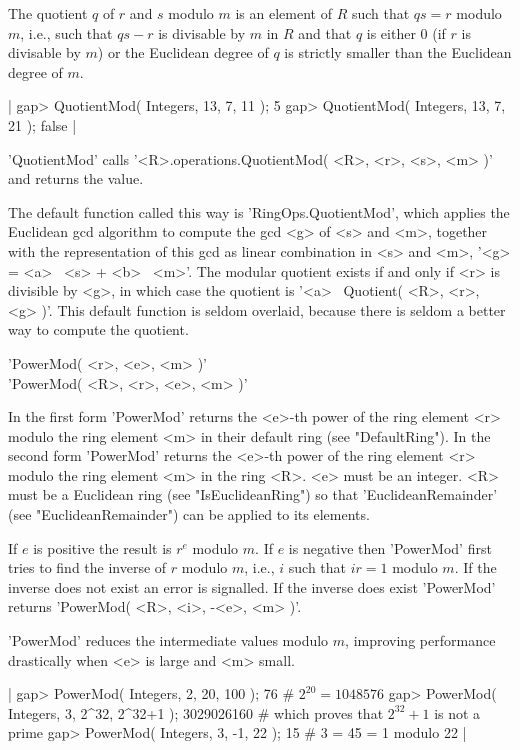 The quotient $q$ of $r$ and $s$ modulo $m$ is an element of $R$ such that
$q s = r$ modulo $m$, i.e., such that $q s - r$  is divisable  by $m$  in
$R$ and  that  $q$  is  either  0 (if  $r$ is divisable  by $m$)  or  the
Euclidean  degree of $q$ is strictly smaller than the Euclidean degree of
$m$.

|    gap> QuotientMod( Integers, 13, 7, 11 );
    5
    gap> QuotientMod( Integers, 13, 7, 21 );
    false |

'QuotientMod'  calls '<R>.operations.QuotientMod( <R>,  <r>,  <s>, <m> )'
and returns the value.

The  default function  called  this  way  is 'RingOps.QuotientMod', which
applies the  Euclidean gcd algorithm to  compute the gcd  <g>  of <s> and
<m>, together with  the  representation of this gcd as linear combination
in <s> and <m>, '<g> = <a>  \*\ <s> + <b> \*\ <m>'.  The modular quotient
exists if and only if <r> is divisible by <g>, in which case the quotient
is '<a> \*\ Quotient( <R>, <r>, <g> )'.  This default function is  seldom
overlaid, because there is seldom a better way to compute the quotient.


'PowerMod( <r>, <e>, <m> )' \\
'PowerMod( <R>, <r>, <e>, <m> )'

In the first form 'PowerMod' returns the <e>-th power of the ring element
<r>   modulo  the   ring   element  <m>   in  their  default  ring   (see
"DefaultRing").  In the second form 'PowerMod' returns  the <e>-th  power
of the ring element <r> modulo the ring element <m> in the ring <R>.  <e>
must be an integer.  <R> must be a Euclidean ring (see "IsEuclideanRing")
so that 'EuclideanRemainder' (see "EuclideanRemainder") can be applied to
its elements.

If $e$ is  positive the  result is $r^e$ modulo $m$.  If $e$  is negative
then 'PowerMod' first tries to find the  inverse of $r$ modulo $m$, i.e.,
$i$ such  that $i r  =  1$  modulo $m$.  If the inverse does not exist an
error  is  signalled.   If  the  inverse  does exist  'PowerMod'  returns
'PowerMod( <R>, <i>, -<e>, <m> )'.

'PowerMod'  reduces   the  intermediate  values  modulo   $m$,  improving
performance drastically when <e> is large and <m>  small.

|    gap> PowerMod( Integers, 2, 20, 100 );
    76        # $2^{20} = 1048576$
    gap> PowerMod( Integers, 3, 2^32, 2^32+1 );
    3029026160        # which proves that $2^{32}+1$ is not a prime
    gap> PowerMod( Integers, 3, -1, 22 );
    15        # 3 = 45 = 1 modulo 22 |

